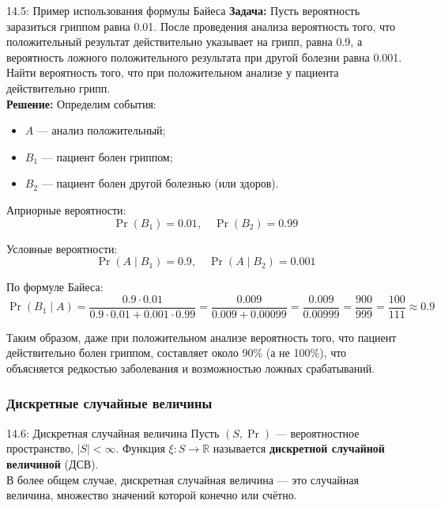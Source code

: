 \documentclass[a4paper,12pt]{article}
\begin{document}
	\begin{examplebox}{14.5: Пример использования формулы Байеса}
		\textbf{Задача:} Пусть вероятность заразиться гриппом равна 0.01. После проведения анализа вероятность того, что положительный результат действительно указывает на грипп, равна 0.9, а вероятность ложного положительного результата при другой болезни равна 0.001. Найти вероятность того, что при положительном анализе у пациента действительно грипп. \\
		
		\textbf{Решение:} Определим события:
		\begin{itemize}
			\item \(A\) — анализ положительный;
			\item \(B_1\) — пациент болен гриппом;
			\item \(B_2\) — пациент болен другой болезнью (или здоров).
		\end{itemize}
		
		Априорные вероятности:
		\[ \Pr(B_1) = 0.01, \quad \Pr(B_2) = 0.99 \]
		
		Условные вероятности:
		\[ \Pr(A \mid B_1) = 0.9, \quad \Pr(A \mid B_2) = 0.001 \]
		
		По формуле Байеса:
		\[ \Pr(B_1 \mid A) = \frac{0.9 \cdot 0.01}{0.9 \cdot 0.01 + 0.001 \cdot 0.99} = \frac{0.009}{0.009 + 0.00099} = \frac{0.009}{0.00999} = \frac{900}{999} = \frac{100}{111} \approx 0.9 \]
		
		Таким образом, даже при положительном анализе вероятность того, что пациент действительно болен гриппом, составляет около 90\% (а не 100\%), что объясняется редкостью заболевания и возможностью ложных срабатываний.
	\end{examplebox}
	
	\subsubsection{Дискретные случайные величины}
	
	\begin{definitionbox}{14.6: Дискретная случайная величина}
		Пусть \((S, \Pr)\) — вероятностное пространство, \(|S| < \infty\). Функция \(\xi : S \to \mathbb{R}\) называется \textbf{дискретной случайной величиной} (ДСВ). \\
		
		В более общем случае, дискретная случайная величина — это случайная величина, множество значений которой конечно или счётно.
	\end{definitionbox}
	
\end{document}
